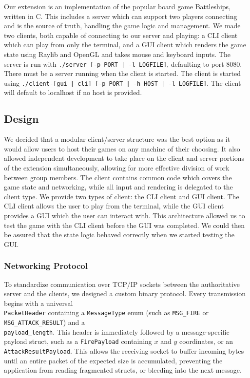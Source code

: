 \documentclass[11pt]{article}
\begin{document}
Our extension is an implementation of the popular board game Battleships, written in C. This includes a server which can support two players connecting and is the source of truth, handling the game logic and management. We made two clients, both capable of connecting to our server and playing: a CLI client which can play from only the terminal, and a GUI client which renders the game state using Raylib and OpenGL and takes mouse and keyboard inputs. The server is run with \texttt{./server [-p PORT | -l LOGFILE]}, defaulting to port 8080. There must be a server running when the client is started. The client is started using \texttt{./client-[gui | cli] [-p PORT | -h HOST | -l LOGFILE]}. The client will default to localhost if no host is provided.

\subsection{Design}

We decided that a modular client/server structure was the best option as it would allow users to host their games on any machine of their choosing. It also allowed independent development to take place on the client and server portions of the extension simultaneously, allowing for more effective division of work between group members. The client contains common code which covers the game state and networking, while all input and rendering is delegated to the client type. We provide two types of client: the CLI client and GUI client. The CLI client allows the user to play from the terminal, while the GUI client provides a GUI which the user can interact with. This architecture allowed us to test the game with the CLI client before the GUI was completed. We could then be assured that the state logic behaved correctly when we started testing the GUI.

\subsubsection{Networking Protocol}
To standardize communication over TCP/IP sockets between the authoritative server and the clients, we designed a custom binary protocol. Every transmission begins with a universal \\\texttt{PacketHeader} containing a \texttt{MessageType} enum (such as \texttt{MSG\_FIRE} or \texttt{MSG\_ATTACK\_RESULT}) and a \\\texttt{payload\_length}. This header is immediately followed by a message-specific payload struct, such as a \texttt{FirePayload} containing $x$ and $y$ coordinates, or an \texttt{AttackResultPayload}. This allows the receiving socket to buffer incoming bytes until an entire packet of the expected size is accumulated, preventing the application from reading fragmented structs, or bleeding into the next message.
\end{document}
